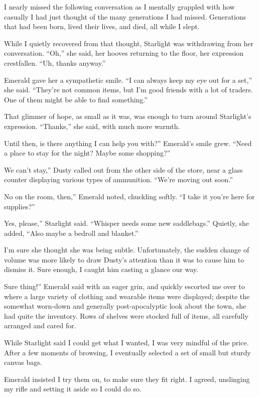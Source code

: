 I nearly missed the following conversation as I mentally grappled with how casually I had just thought of the many generations I had missed. Generations that had been born, lived their lives, and died, all while I slept.

While I quietly recovered from that thought, Starlight was withdrawing from her conversation. “Oh,” she said, her hooves returning to the floor, her expression crestfallen. “Uh, thanks anyway.”

Emerald gave her a sympathetic smile. “I can always keep my eye out for a set,” she said. “They’re not common items, but I’m good friends with a lot of traders. One of them might be able to find something.”

That glimmer of hope, as small as it was, was enough to turn around Starlight’s expression. “Thanks,” she said, with much more warmth.

\leavevmode{}Until then, is there anything I can help you with?” Emerald’s smile grew. “Need a place to stay for the night? Maybe some shopping?”

\leavevmode{}We can’t stay,” Dusty called out from the other side of the store, near a glass counter displaying various types of ammunition. “We’re moving out soon.”

\leavevmode{}No on the room, then,” Emerald noted, chuckling softly. “I take it you’re here for supplies?”

\leavevmode{}Yes, please,” Starlight said. “Whisper needs some new saddlebags.” Quietly, she added, “Also maybe a bedroll and blanket.”

I’m sure she thought she was being subtle. Unfortunately, the sudden change of volume was more likely to draw Dusty’s attention than it was to cause him to dismiss it. Sure enough, I caught him casting a glance our way.

\leavevmode{}Sure thing!” Emerald said with an eager grin, and quickly escorted me over to where a large variety of clothing and wearable items were displayed; despite the somewhat worn-down and generally post-apocalyptic look about the town, she had quite the inventory. Rows of shelves were stocked full of items, all carefully arranged and cared for.

While Starlight said I could get what I wanted, I was very mindful of the price. After a few moments of browsing, I eventually selected a set of small but sturdy canvas bags.

Emerald insisted I try them on, to make sure they fit right. I agreed, unslinging my rifle and setting it aside so I could do so.

